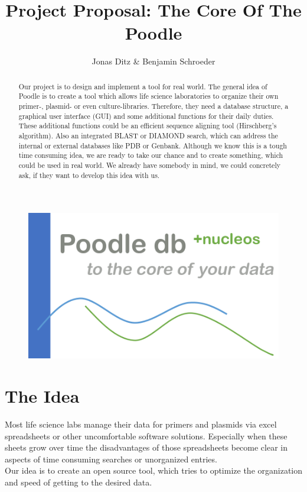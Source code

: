 \documentclass[]{article}
\title{Project Proposal: The Core Of The Poodle}
\author{Jonas Ditz  \& Benjamin Schroeder}
\begin{document}
\maketitle
\begin{figure}[h]
	\centering
	\includegraphics[scale=0.35]{../img/logo_poodle.png}
\end{figure}

\begin{abstract}
Our project is to design and implement a tool for real world. The general idea of Poodle is to create a tool which allows life science laboratories to organize their own primer-, plasmid- or even culture-libraries. Therefore, they need a database structure, a graphical user interface (GUI) and some additional functions for their daily duties. These additional functions could be an efficient sequence aligning tool (Hirschberg's algorithm). Also an integrated BLAST or DIAMOND search, which can address the internal or external databases like PDB or Genbank. Although we know this is a tough time consuming idea, we are ready to take our chance and to create something, which could be used in real world. We already have somebody in mind, we could concretely ask, if they want to develop this idea with us.
\end{abstract}

\section{ The Idea}
Most life science labs manage their data for primers and plasmids via excel spreadsheets or other uncomfortable software solutions. Especially when these sheets grow over time the disadvantages of those spreadsheets become clear in aspects of time consuming searches or unorganized entries. 
\\
Our idea is to create an open source tool, which tries to optimize the organization and speed of getting to the desired data.
\end{document}
